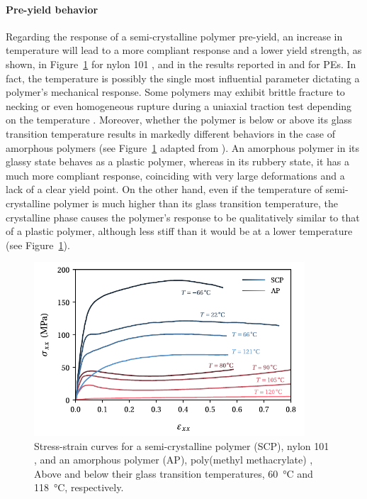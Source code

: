 \paragraph{Pre-yield behavior}
Regarding the response of a semi-crystalline polymer pre-yield, an increase in temperature will lead to a more compliant response and a lower yield strength, as shown, in Figure~\ref{fig:scheme_effect_temperature} for nylon 101 \citep{khanThermomechanicalResponseNylon2006}, and in the results reported in \cite{brownInfluenceMolecularConformation2007} and \cite{hobeikaTemperatureStrainRate2000} for PEs.
In fact, the temperature is possibly the single most influential parameter dictating a polymer's mechanical response.
Some polymers may exhibit brittle fracture to necking or even homogeneous rupture during a uniaxial traction test depending on the temperature \citep{wardIntroductionMechanicalProperties2004}.
Moreover, whether the polymer is below or above its glass transition temperature results in markedly different behaviors in the case of amorphous polymers (see Figure~\ref{fig:scheme_effect_temperature} adapted from \cite{vanloockDeformationFailureMaps2018}).
An amorphous polymer in its glassy state behaves as a plastic polymer, whereas in its rubbery state, it has a much more compliant response, coinciding with very large deformations and a lack of a clear yield point.
On the other hand, even if the temperature of semi-crystalline polymer is much higher than its glass transition temperature, the crystalline phase causes the polymer's response to be qualitatively similar to that of a plastic polymer, although less stiff than it would be at a lower temperature (see Figure~\ref{fig:scheme_effect_temperature}).
\begin{figure}[hbtp]
	\centering
	\includegraphics[width=0.9\textwidth]{figures/scheme_effect_temperature}
	\caption{Stress-strain curves for a semi-crystalline polymer (SCP), nylon 101 \citep{khanThermomechanicalResponseNylon2006}, and an amorphous polymer (AP), poly(methyl methacrylate) \citep{vanloockDeformationFailureMaps2018}, Above and below their glass transition temperatures, \SI{60}{\celsius} and \SI{118}{\celsius}, respectively.}
\label{fig:scheme_effect_temperature}
\end{figure}

